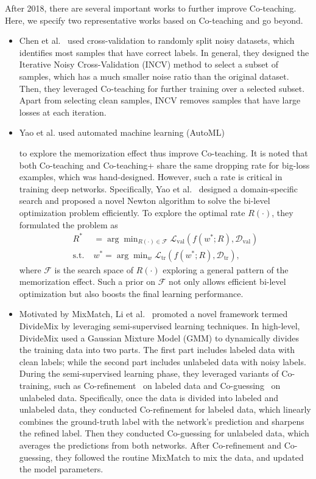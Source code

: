 After 2018, 
there are several important works to further improve Co-teaching. 
Here, we specify two representative works based on Co-teaching and go beyond. 
\begin{itemize}[leftmargin=*]
\item 
Chen et al.~ used cross-validation to randomly split noisy datasets, which identifies most samples that have correct labels. In general, they designed the Iterative Noisy Cross-Validation (INCV) method to select a subset of samples, which has a much smaller noise ratio than the original dataset. Then, they leveraged Co-teaching for further training over a selected subset. Apart from selecting clean samples, INCV removes samples that have large losses at each iteration.
\item 
Yao et al.  used automated machine learning (AutoML) 

to explore the memorization effect thus improve Co-teaching. 
It is noted that both Co-teaching and Co-teaching+ share the same dropping rate for big-loss examples, 
which was hand-designed. However, such a rate is critical in training deep networks. 
Specifically, Yao et al.~ designed a domain-specific search and proposed
a novel Newton algorithm to solve the bi-level optimization problem efficiently. 
To explore the optimal rate $R(\cdot)$, they formulated the problem as
\begin{align*}
R^* & = \arg\min\nolimits_{R(\cdot) \in \mathcal{F}} \mathcal{L}_{\text{val}}(f(w^*;R),\mathcal{D}_{\text{val}})
\\
\text{s.t.} \;
& w^* = \arg\min\nolimits_{w} \mathcal{L}_{\text{tr}}(f(w^*;R),\mathcal{D}_{\text{tr}}),
\end{align*}
where $\mathcal{F}$ is the search space of $R(\cdot)$ exploring a general pattern of the memorization effect. 
Such a prior on $\mathcal{F}$ not only allows 
efficient bi-level optimization
but also boosts the final learning performance. 
\item
Motivated by MixMatch,
Li et al.~ promoted a novel framework termed DivideMix by leveraging semi-supervised learning techniques. 
In high-level, DivideMix used a Gaussian Mixture Model (GMM) to dynamically
divides the training data into two parts. The first part includes labeled data
with clean labels; while the second part includes unlabeled data with noisy
labels. During the semi-supervised learning phase, they leveraged variants of
Co-training, such as Co-refinement~ on labeled data and
Co-guessing~ on unlabeled data. Specifically, once the data is divided into labeled and unlabeled data, they conducted Co-refinement for labeled data, which linearly combines the ground-truth label with the network's prediction and sharpens the refined label. Then they conducted Co-guessing for unlabeled data, which averages the predictions from both networks. After Co-refinement and Co-guessing, they followed the routine MixMatch to mix the data, and updated the model parameters.
\end{itemize}

